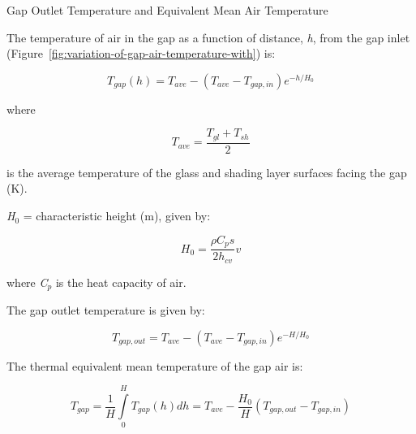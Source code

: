 Gap Outlet Temperature and Equivalent Mean Air Temperature

The temperature of air in the gap as a function of distance, \emph{h}, from the gap inlet (Figure~\ref{fig:variation-of-gap-air-temperature-with}) is:

\begin{equation}
{T_{gap}}(h) = {T_{ave}} - ({T_{ave}} - {T_{gap,in}}){e^{ - h/{H_0}}}
\end{equation}

where

\begin{equation}
{T_{ave}} = \frac{{{T_{gl}} + {T_{sh}}}}{2}
\label{eq:GlassShadingLayerAverageTemperature}
\end{equation}

is the average temperature of the glass and shading layer surfaces facing the gap (K).

\emph{H\(_{0}\)} = characteristic height (m), given by:

\begin{equation}
{H_0} = \frac{{\rho {C_p}s}}{{2{h_{cv}}}}v
\end{equation}

where \emph{C\(_{p}\)} is the heat capacity of air.

The gap outlet temperature is given by:

\begin{equation}
{T_{gap,out}} = {T_{ave}} - ({T_{ave}} - {T_{gap,in}}){e^{ - H/{H_0}}}
\label{eq:TgapoutEquation}
\end{equation}

The thermal equivalent mean temperature of the gap air is:

\begin{equation}
{T_{gap}} = \frac{1}{H}\int\limits_0^H {{T_{gap}}(h)dh = {T_{ave}} - \frac{{{H_0}}}{H}} \left( {{T_{gap,out}} - {T_{gap,in}}} \right)
\label{eq:TgapEquation}
\end{equation}

